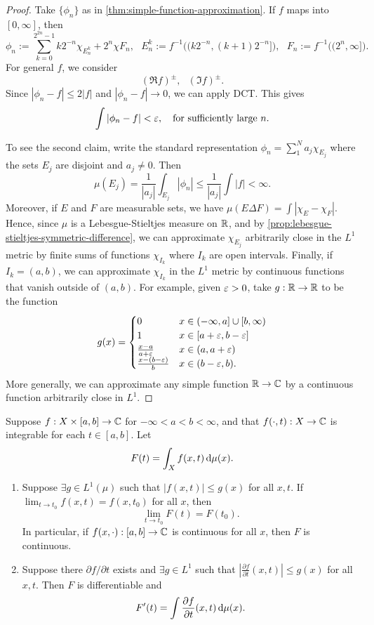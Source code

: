 \documentclass[12pt]{article} %
\begin{document}
\begin{proof}
    Take $\{\phi_n\}$ as in \cref{thm:simple-function-approximation}. If $f$ maps into $[0, \infty]$, then \[\phi_n := \sum_{k = 0}^{2^{2n} - 1} k 2^{-n} \chi_{E_n^k} + 2^n \chi F_n, \ \ \ E_n^k := f^{-1}\Big((k2^{-n}, (k+1)2^{-n}]\Big), \ \ \ F_n := f^{-1}\Big( (2^n, \infty]\Big).\] For general $f$, we consider \[(\Re f)^{\pm}, \ \ \ (\Im f)^{\pm}.\] Since $|\phi_n - f| \leq 2|f|$ and $|\phi_n - f| \to 0$, we can apply DCT. This gives \[\int |\phi_n - f| < \varepsilon, \ \ \ \text{for sufficiently large $n$}.\]

    To see the second claim, write the standard representation $\phi_n = \sum_1^N a_j \chi_{E_j}$ where the sets $E_j$ are disjoint and $a_j \neq 0$. Then \[\mu(E_j) = \frac{1}{|a_j|} \int_{E_j}|\phi_n| \leq \frac{1}{|a_j|} \int |f| < \infty.\] Moreover, if $E$ and $F$ are measurable sets, we have $\mu(E \Delta F) = \int |\chi_E - \chi_F|$. Hence, since $\mu$ is a Lebesgue-Stieltjes measure on $\mathbb{R}$, and by \cref{prop:lebesgue-stieltjes-symmetric-difference}, we can approximate $\chi_{E_j}$ arbitrarily close in the $L^1$ metric by finite sums of functions $\chi_{I_k}$ where $I_k$ are open intervals. Finally, if $I_k = (a, b)$, we can approximate $\chi_{I_k}$ in the $L^1$ metric by continuous functions that vanish outside of $(a, b)$. For example, given $\varepsilon > 0$, take $g : \mathbb{R} \to \mathbb{R}$ to be the function \[g(x) = \begin{cases}
        0 &x \in (-\infty, a] \cup [b, \infty)\\
        1 &x \in [a + \varepsilon, b - \varepsilon]\\
        \frac{x-a}{a+\varepsilon} &x \in (a, a+ \varepsilon)\\
        \frac{x- (b - \varepsilon)}{b} &x \in (b-\varepsilon, b).
    \end{cases}\]
    More generally, we can approximate any simple function $\mathbb{R} \to \mathbb{C}$ by a continuous function arbitrarily close in $L^1$.
\end{proof}

\begin{theorem}
    Suppose $f : X \times [a, b] \to \mathbb{C}$ for $-\infty < a < b < \infty$, and that $f(\cdot, t) : X \to \mathbb{C}$ is integrable for each $t \in [a, b]$. Let \[F(t) = \int_X f(x, t) \, \mathrm{d} \mu(x).\] \begin{enumerate}
        \item Suppose $\exists g \in L^1(\mu)$ such that $|f(x, t)| \leq g(x)$ for all $x, t$. If $\lim_{t \to t_0} f(x, t) = f(x,t_0)$ for all $x$, then \[\lim_{t \to t_0} F(t) = F(t_0).\] In particular, if $f(x, \cdot) : [a, b] \to \mathbb{C}$ is continuous for all $x$, then $F$ is continuous.
        \item Suppose there $\partial f / \partial t$ exists and $\exists g \in L^1$ such that $\left| \frac{\partial f}{\partial t}(x, t) \right| \leq g(x)$ for all $x, t$. Then $F$ is differentiable and \[F'(t) = \int \frac{\partial f}{\partial t}(x, t) \, \mathrm{d} \mu(x).\]
    \end{enumerate}
\end{theorem}
\end{document}
